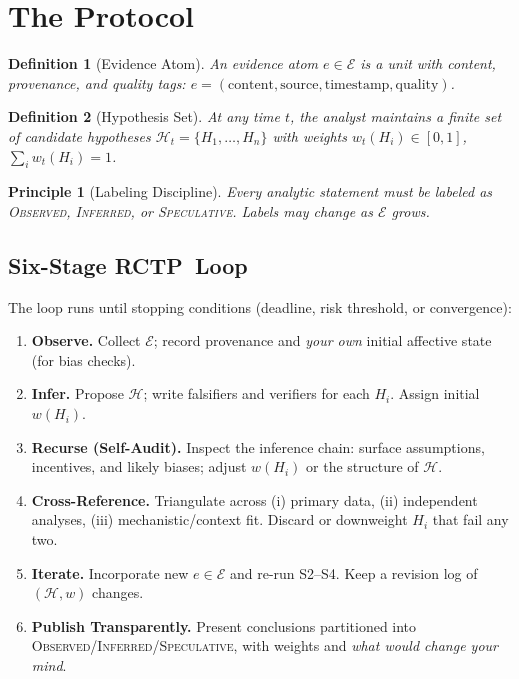 \documentclass[11pt]{article}
\newcommand{\Obs}{\textsc{Observed}}
\newcommand{\Inf}{\textsc{Inferred}}
\newcommand{\Spec}{\textsc{Speculative}}
\newcommand{\rctp}{\textsc{RCTP}}
\newcommand{\Hset}{\mathcal{H}}
\newcommand{\Evid}{\mathcal{E}}
\newtheorem{definition}{Definition}
\newtheorem{principle}{Principle}
\begin{document}
\section{The Protocol}
\begin{definition}[Evidence Atom]
An evidence atom $e \in \Evid$ is a unit with content, provenance, and quality tags: $e = (\text{content}, \text{source}, \text{timestamp}, \text{quality})$.
\end{definition}

\begin{definition}[Hypothesis Set]
At any time $t$, the analyst maintains a finite set of candidate hypotheses $\Hset_t = \{H_1,\dots,H_n\}$ with weights $w_t(H_i) \in [0,1]$, $\sum_i w_t(H_i)=1$.
\end{definition}

\begin{principle}[Labeling Discipline]
Every analytic statement must be labeled as \Obs, \Inf, or \Spec. Labels may change as $\Evid$ grows.
\end{principle}

\subsection{Six-Stage \rctp\ Loop}
The loop runs until stopping conditions (deadline, risk threshold, or convergence):
\begin{enumerate}[label=\textbf{S\arabic*:}, wide]
  \item \textbf{Observe.} Collect $\Evid$; record provenance and \emph{your own} initial affective state (for bias checks).
  \item \textbf{Infer.} Propose $\Hset$; write falsifiers and verifiers for each $H_i$. Assign initial $w(H_i)$.
  \item \textbf{Recurse (Self-Audit).} Inspect the inference chain: surface assumptions, incentives, and likely biases; adjust $w(H_i)$ or the structure of $\Hset$.
  \item \textbf{Cross-Reference.} Triangulate across (i) primary data, (ii) independent analyses, (iii) mechanistic/context fit. Discard or downweight $H_i$ that fail any two.
  \item \textbf{Iterate.} Incorporate new $e \in \Evid$ and re-run S2--S4. Keep a revision log of $(\Hset, w)$ changes.
  \item \textbf{Publish Transparently.} Present conclusions partitioned into \Obs/\Inf/\Spec, with weights and \emph{what would change your mind}.
\end{enumerate}
\end{document}
